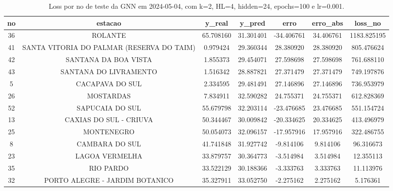 \begin{table}[h]
\centering
\caption{Loss por no de teste da GNN em 2024-05-04, com k=2, HL=4, hidden=24, epochs=100 e lr=0.001.}
\label{tab:gnn_loss_k2_hl4_h24_e100_d20240504}
\begin{tabular}{ccccccc}
\toprule
no & estacao & y\_real & y\_pred & erro & erro\_abs & loss\_no \\
\midrule
36 & ROLANTE & 65.708160 & 31.301401 & -34.406761 & 34.406761 & 1183.825195 \\
41 & SANTA VITORIA DO PALMAR (RESERVA DO TAIM) & 0.979424 & 29.360344 & 28.380920 & 28.380920 & 805.476624 \\
42 & SANTANA DA BOA VISTA & 1.855373 & 29.454071 & 27.598698 & 27.598698 & 761.688110 \\
43 & SANTANA DO LIVRAMENTO & 1.516342 & 28.887821 & 27.371479 & 27.371479 & 749.197876 \\
5 & CACAPAVA DO SUL & 2.334595 & 29.481491 & 27.146896 & 27.146896 & 736.953979 \\
26 & MOSTARDAS & 7.834911 & 32.590282 & 24.755371 & 24.755371 & 612.828369 \\
52 & SAPUCAIA DO SUL & 55.679798 & 32.203114 & -23.476685 & 23.476685 & 551.154724 \\
13 & CAXIAS DO SUL - CRIUVA & 50.344467 & 30.009842 & -20.334625 & 20.334625 & 413.496979 \\
25 & MONTENEGRO & 50.054073 & 32.096157 & -17.957916 & 17.957916 & 322.486755 \\
8 & CAMBARA DO SUL & 41.741848 & 31.927742 & -9.814106 & 9.814106 & 96.316673 \\
23 & LAGOA VERMELHA & 33.879757 & 30.364773 & -3.514984 & 3.514984 & 12.355113 \\
35 & RIO PARDO & 33.522129 & 30.188366 & -3.333763 & 3.333763 & 11.113976 \\
32 & PORTO ALEGRE - JARDIM BOTANICO & 35.327911 & 33.052750 & -2.275162 & 2.275162 & 5.176361 \\
\bottomrule
\end{tabular}
\end{table}
